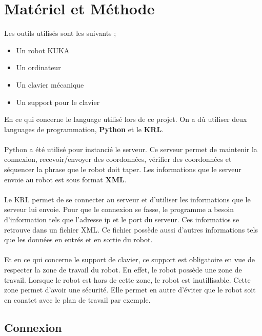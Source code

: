 \section{Matériel et Méthode}

Les outils utilisés sont les suivants ;

\begin{itemize}
    \item Un robot KUKA
    \item Un ordinateur
    \item Un clavier mécanique
    \item Un support pour le clavier
\end{itemize}

En ce qui concerne le language utilisé lors de ce projet.
On a dû utiliser deux languages de programmation, \textbf{Python} et le \textbf{KRL}.
\\
\\
Python a été utilisé pour instancié le serveur.
Ce serveur permet de maintenir la connexion, recevoir/envoyer des coordonnées, vérifier des coordonnées et séquencer la phrase que le robot doit taper.
Les informations que le serveur envoie au robot est sous format \textbf{XML}.
\\
\\
Le KRL permet de se connecter au serveur et d'utiliser les informations que le serveur lui envoie.
Pour que le connexion se fasse, le programme a besoin d'information tels que l'adresse ip et le port du serveur.
Ces informatios se retrouve dans un fichier XML.
Ce fichier possède aussi d'autres informations tels que les données en entrés et en sortie du robot.
\\
\\
Et en ce qui concerne le support de clavier, ce support est obligatoire en vue de respecter la zone de travail du robot.
En effet, le robot possède une zone de travail.
Lorsque le robot est hors de cette zone, le robot est inutillisable.
Cette zone permet d'avoir une sécurité.
Elle permet en autre d'éviter que le robot soit en conatct avec le plan de travail par exemple.

\subsection{Connexion}

